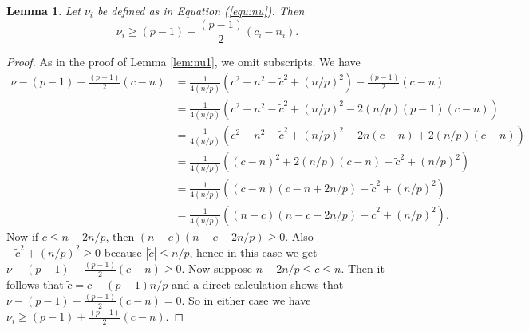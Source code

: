\documentclass{amsart}
\newtheorem{lemma}[theorem]{Lemma}
\theoremstyle{definition}
\theoremstyle{remark}
\numberwithin{equation}{section}
\begin{document}
\begin{lemma}\label{lem:nu2}
Let $\nu_i$ be defined as in Equation (\ref{equ:nu}). Then
\[
\nu_i \ge (p-1) + \frac{(p-1)}{2}( c_i - n_i ).
\]
\end{lemma}
\begin{proof}
As in the proof of Lemma \ref{lem:nu1}, we omit subscripts. We have
\begin{align*}
\nu - (p-1) - \frac{(p-1)}{2}(c-n) &= \frac{1}{4(n/p)}\left( c^2 - n^2 - \widetilde{c}^2 + (n/p)^2 \right) - \frac{(p-1)}{2}(c-n) \\
&= \frac{1}{4(n/p)}\left( c^2 - n^2 - \widetilde{c}^2 + (n/p)^2 - 2(n/p)(p-1)(c-n) \right) \\
&= \frac{1}{4(n/p)}\left( c^2 - n^2 - \widetilde{c}^2 + (n/p)^2 - 2n(c-n) + 2(n/p)(c-n) \right) \\
&= \frac{1}{4(n/p)}\left( (c-n)^2 + 2(n/p)(c-n) - \widetilde{c}^2 + (n/p)^2 \right) \\
&= \frac{1}{4(n/p)}\left( (c-n)(c-n + 2n/p) - \widetilde{c}^2 + (n/p)^2 \right) \\
&= \frac{1}{4(n/p)}\left( (n-c)(n-c - 2n/p) - \widetilde{c}^2 + (n/p)^2 \right).
\end{align*}
Now if $c \le n - 2n/p$, then $(n-c)(n-c - 2n/p) \ge 0$. Also $ - \widetilde{c}^2 + (n/p)^2 \ge 0$ because $|\widetilde{c}| \le n/p$, hence in this case we get $\nu - (p-1) - \frac{(p-1)}{2}(c-n) \ge 0$. Now suppose $n - 2n/p \le c \le n$. Then it follows that $\widetilde{c} = c - (p-1)n/p$ and a direct calculation shows that $\nu - (p-1) - \frac{(p-1)}{2}(c-n) = 0$. So in either case we have $\nu_i \ge (p-1) + \frac{(p-1)}{2}(c-n)$.
\end{proof}
\end{document}
